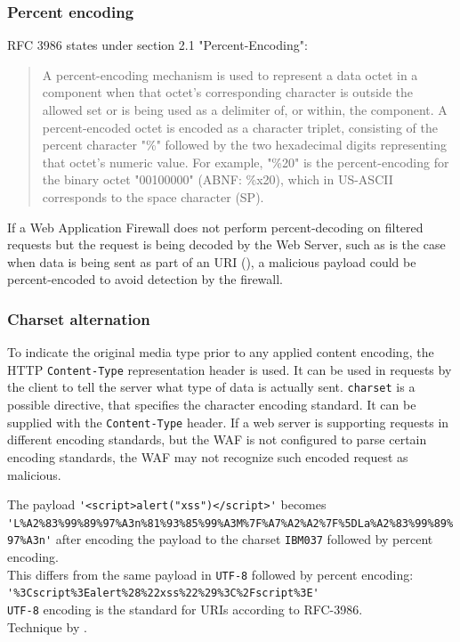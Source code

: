\subsubsection{Percent encoding}
RFC 3986 states under section 2.1 "Percent-Encoding":
\begin{quote}
	A percent-encoding mechanism is used to represent a data octet in a
	component when that octet's corresponding character is outside the
	allowed set or is being used as a delimiter of, or within, the
	component.  A percent-encoded octet is encoded as a character
	triplet, consisting of the percent character "\%" followed by the two
	hexadecimal digits representing that octet's numeric value.  For
	example, "\%20" is the percent-encoding for the binary octet
	"00100000" (ABNF: \%x20), which in US-ASCII corresponds to the space
	character (SP). \cite{rfc3986}
\end{quote}
If a Web Application Firewall does not perform percent-decoding on filtered requests but the request is being decoded by the Web Server, such as is the case when data is being sent as part of an URI (\cite{rfc3986/sec2.4}), a malicious payload could be percent-encoded to avoid detection by the firewall.

\subsubsection{Charset alternation}
To indicate the original media type prior to any applied content encoding, the HTTP \verb|Content-Type| representation header is used.
It can be used in requests by the client to tell the server what type of data is actually sent.
\verb|charset| is a possible directive, that specifies the character encoding standard.
It can be supplied with the \verb|Content-Type| header. \cite{http/contenttype}
If a web server is supporting requests in different encoding standards, but the WAF is not configured to parse certain encoding standards, the WAF may not recognize such encoded request as malicious.

The payload \verb|'<script>alert("xss")</script>'| becomes \\
\verb|'L%A2%83%99%89%97%A3n%81%93%85%99%A3M%7F%A7%A2%A2%7F%5DLa%A2%83%99%89%97%A3n'|
after encoding the payload to the charset \verb|IBM037| followed by percent encoding. \\
This differs from the same payload in \verb|UTF-8| followed by percent encoding: \\
\verb|'%3Cscript%3Ealert%28%22xss%22%29%3C%2Fscript%3E'| \\
\verb|UTF-8| encoding is the standard for URIs according to RFC-3986. \cite{rfc3986} \\
Technique by \cite{medium/allypetitt}.

